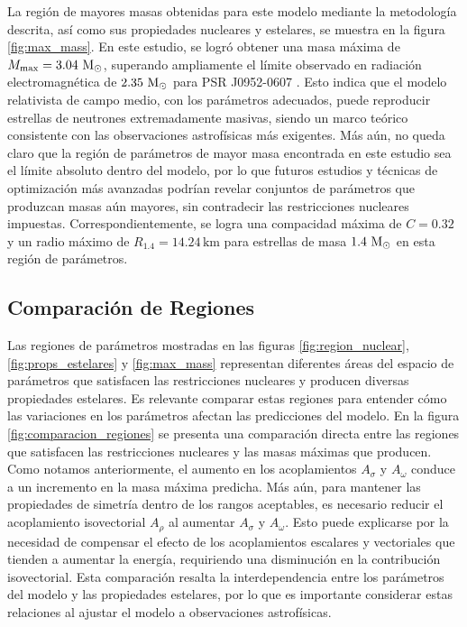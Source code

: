 La región de mayores masas obtenidas para este modelo mediante la metodología descrita, así como sus propiedades nucleares y estelares, se muestra en la figura \ref{fig:max_mass}. En este estudio, se logró obtener una masa máxima de $M_\text{max} = 3.04 \, \,\text{M}_\odot$, superando ampliamente el límite observado en radiación electromagnética de $2.35 \, \,\text{M}_\odot$ para PSR J0952-0607 \cite{romaniPSRJ09520607Fastest2022}. Esto indica que el modelo relativista de campo medio, con los parámetros adecuados, puede reproducir estrellas de neutrones extremadamente masivas, siendo un marco teórico consistente con las observaciones astrofísicas más exigentes. Más aún, no queda claro que la región de parámetros de mayor masa encontrada en este estudio sea el límite absoluto dentro del modelo, por lo que futuros estudios y técnicas de optimización más avanzadas podrían revelar conjuntos de parámetros que produzcan masas aún mayores, sin contradecir las restricciones nucleares impuestas. Correspondientemente, se logra una compacidad máxima de $C = 0.32$ y un radio máximo de $R_{1.4} = 14.24 \, \text{km}$ para estrellas de masa $1.4 \, \,\text{M}_\odot$ en esta región de parámetros.

\subsection{Comparación de Regiones}

Las regiones de parámetros mostradas en las figuras \ref{fig:region_nuclear}, \ref{fig:props_estelares} y \ref{fig:max_mass} representan diferentes áreas del espacio de parámetros que satisfacen las restricciones nucleares y producen diversas propiedades estelares. Es relevante comparar estas regiones para entender cómo las variaciones en los parámetros afectan las predicciones del modelo. En la figura \ref{fig:comparacion_regiones} se presenta una comparación directa entre las regiones que satisfacen las restricciones nucleares y las masas máximas que producen. Como notamos anteriormente, el aumento en los acoplamientos $A_\sigma$ y $A_\omega$ conduce a un incremento en la masa máxima predicha. Más aún, para mantener las propiedades de simetría dentro de los rangos aceptables, es necesario reducir el acoplamiento isovectorial $A_\rho$ al aumentar $A_\sigma$ y $A_\omega$. Esto puede explicarse por la necesidad de compensar el efecto de los acoplamientos escalares y vectoriales que tienden a aumentar la energía, requiriendo una disminución en la contribución isovectorial. Esta comparación resalta la interdependencia entre los parámetros del modelo y las propiedades estelares, por lo que es importante considerar estas relaciones al ajustar el modelo a observaciones astrofísicas.


